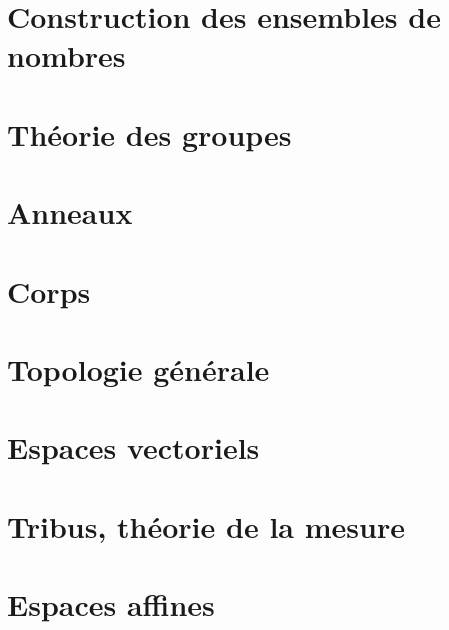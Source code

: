 \emptyInputPath
{}



\chapter{Construction des ensembles de nombres}


\chapter{Théorie des groupes}



\chapter{Anneaux}


\chapter{Corps}





\chapter{Topologie générale}



\chapter{Espaces vectoriels}









\chapter{Tribus, théorie de la mesure}





\chapter{Espaces affines}


